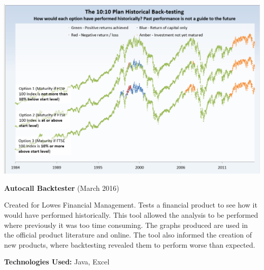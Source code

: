 \documentclass[hidelinks, 12pt, a4paper]{article}
\begin{document}
\begin{minipage}{0.40\textwidth}
		\begin{center}
			\includegraphics[width=0.9\linewidth]{backtest.png}
		\end{center}
		\vspace{-12pt}
		\textbf{Autocall Backtester} (March 2016)
		
		Created for Lowes Financial Management. Tests a financial product to see how it would have performed historically. This tool allowed the analysis to be performed where previously it was too time consuming. The graphs produced are used in the official product literature and online. The tool also informed the creation of new products, where backtesting revealed them to perform worse than expected.
		
		\textbf{Technologies Used:} Java, Excel
	\end{minipage}
	\hspace{0.02\textwidth}
	
	
\end{document}
